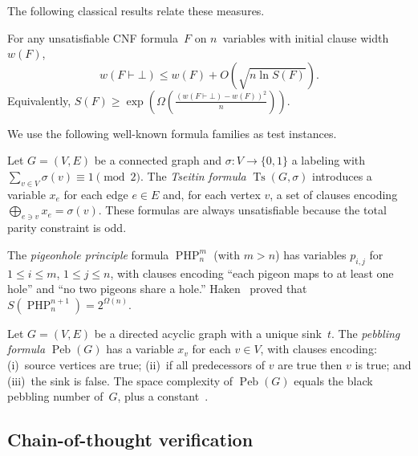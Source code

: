 The following classical results relate these measures.

\begin{theorem}
\label{thm:bsw}
For any unsatisfiable CNF formula~$F$ on $n$~variables with initial clause
width $w(F)$,
\[
w(F \vdash \bot) \le w(F) + O\!\left(\sqrt{n \ln S(F)}\right).
\]
Equivalently, $S(F) \ge \exp\!\left(\Omega\!\left(\frac{(w(F \vdash \bot) -
w(F))^2}{n}\right)\right)$.
\end{theorem}

We use the following well-known formula families as test instances.

\begin{definition}\label{def:tseitin}
Let $G = (V, E)$ be a connected graph and $\sigma \colon V \to \{0,1\}$ a
labeling with $\sum_{v \in V} \sigma(v) \equiv 1 \pmod{2}$.  The
\emph{Tseitin formula} $\operatorname{Ts}(G, \sigma)$ introduces a variable
$x_e$ for each edge $e \in E$ and, for each vertex $v$, a set of clauses
encoding $\bigoplus_{e \ni v} x_e = \sigma(v)$.  These formulas are always
unsatisfiable because the total parity constraint is odd.
\end{definition}

\begin{definition}\label{def:php}
The \emph{pigeonhole principle} formula $\operatorname{PHP}^m_n$ (with $m > n$)
has variables $p_{i,j}$ for $1 \le i \le m$, $1 \le j \le n$, with clauses
encoding ``each pigeon maps to at least one hole'' and ``no two pigeons share a
hole.''  Haken~\cite{haken1985intractability} proved that
$S(\operatorname{PHP}^{n+1}_n) = 2^{\Omega(n)}$.
\end{definition}

\begin{definition}\label{def:pebbling}
Let $G = (V, E)$ be a directed acyclic graph with a unique sink~$t$.  The
\emph{pebbling formula} $\operatorname{Peb}(G)$ has a variable $x_v$ for each
$v \in V$, with clauses encoding: (i)~source vertices are true; (ii)~if all
predecessors of $v$ are true then $v$ is true; and (iii)~the sink is false.
The space complexity of $\operatorname{Peb}(G)$ equals the black pebbling
number of~$G$, plus a constant~\cite{bensasson2001short}.
\end{definition}

\subsection{Chain-of-thought verification}\label{sec:prelim-cot}

